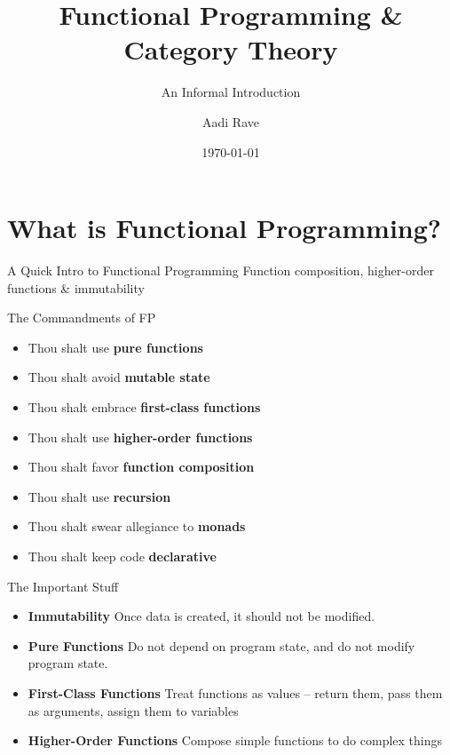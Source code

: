 \documentclass{purdue-slide}
\title{Functional Programming \& Category Theory}
\subtitle{An Informal Introduction}
\author{Aadi Rave}
\institute{Purdue University}
\date{\today}
\begin{document}
\begin{titleframe}{}
    \maketitle
\end{titleframe}

\section{What is Functional Programming?}

\begin{titleframe}{A Quick Intro to Functional Programming}
Function composition, higher-order functions \& immutability
\end{titleframe}

\begin{frame}{The Commandments of FP}
    \begin{itemize}
        \item Thou shalt use \textbf{pure functions}
        \item Thou shalt avoid \textbf{mutable state}
        \item Thou shalt embrace \textbf{first-class functions}
        \item Thou shalt use \textbf{higher-order functions}
        \item Thou shalt favor \textbf{function composition}
        \item Thou shalt use \textbf{recursion}
        \item Thou shalt swear allegiance to \textbf{monads}
        \item Thou shalt keep code \textbf{declarative}
    \end{itemize}
\end{frame}

\begin{frame}{The Important Stuff}
    \begin{itemize}
        \item \textbf{Immutability} Once data is created, it should not be modified. 
        \item \textbf{Pure Functions} Do not depend on program state, and do not modify program state.
        \item \textbf{First-Class Functions} Treat functions as values -- return them, pass them as arguments, assign them to variables
        \item \textbf{Higher-Order Functions} Compose simple functions to do complex things
    \end{itemize}
\end{frame}
\end{document}
